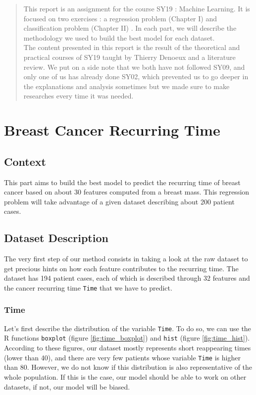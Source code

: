 \documentclass[]{report}
\begin{document}
\begin{abstract}
	
	
	
This report is an assignment for the course SY19 : Machine Learning. It is focused on two exercises : a regression problem (Chapter I) and classification problem (Chapter II) . In each part, we will describe the methodology we used to build the best model for each dataset.\\
The content presented in this report is the result of the theoretical and practical courses of SY19 taught by Thierry Denoeux and a literature review. We put on a side note that we both have not followed SY09, and only one of us has already done SY02, which prevented us to go deeper in the explanations and analysis sometimes but we made sure to make researches every time it was needed.

\end{abstract}


\tableofcontents



\chapter{Breast Cancer Recurring Time}

\section{Context}
This part aims to build the best model to predict the recurring time of breast cancer based on about 30 features computed from a breast mass.  This regression problem will take advantage of a given dataset describing about 200 patient cases.

\section{Dataset Description}
The very first step of our method consists in taking a look at the raw dataset to get precious hints on how each feature contributes to the recurring time. The dataset has 194 patient cases, each of which is described through 32 features and the cancer recurring time \texttt{Time} that we have to predict.

\subsection{Time}
Let's first describe the distribution of the variable \texttt{Time}. To do so, we can use the R functions \texttt{boxplot} (figure \ref{fig:time_boxplot}) and \texttt{hist} (figure \ref{fig:time_hist}). According to these figures, our dataset mostly represents short reappearing times (lower than 40), and there are very few patients whose variable \texttt{Time} is higher than 80. However, we do not know if this distribution is also representative of the whole population. If this is the case, our model should be able to work on other datasets, if not, our model will be biased.
\end{document}
